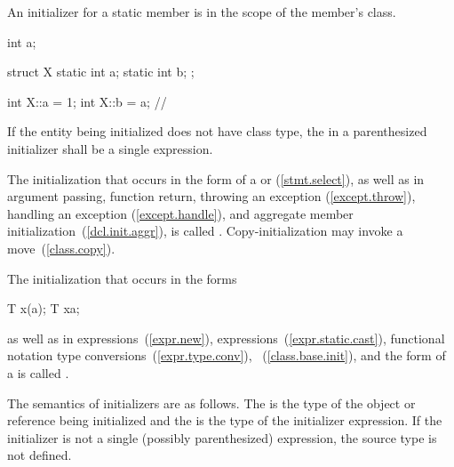 \pnum
{}%
An initializer for a static member is in the scope of the member's class.
\enterexample

\begin{codeblock}
int a;

struct X {
  static int a;
  static int b;
};

int X::a = 1;
int X::b = a;       // 
\end{codeblock}
\exitexample

\pnum
If the entity being initialized does not have class type, the
 in a
parenthesized initializer shall be a single expression.

\pnum
{}%
%
The initialization that occurs in the \tcode{=} form of a
 or
 (\ref{stmt.select}),
as well as in argument passing, function return,
throwing an exception (\ref{except.throw}),
handling an exception (\ref{except.handle}),
and aggregate member initialization~(\ref{dcl.init.aggr}),
is called
.
\enternote Copy-initialization may invoke a move~(\ref{class.copy}). \exitnote

\pnum
The initialization that occurs in the forms

\begin{codeblock}
T x(a);
T x{a};
\end{codeblock}

as well as in
expressions~(\ref{expr.new}),
expressions~(\ref{expr.static.cast}),
functional notation type conversions~(\ref{expr.type.conv}),
~(\ref{class.base.init}), and
the  form of a 
is called
.

\pnum
The semantics of initializers are as follows.
The
%
is the type of the object or reference being initialized and the
is the type of the initializer expression.
If the initializer is not a single (possibly parenthesized) expression, the
source type is not defined.

